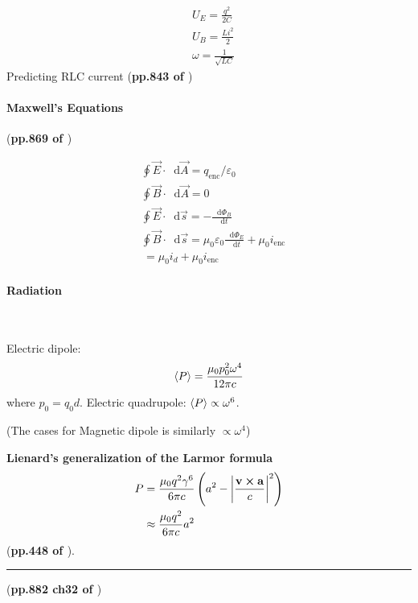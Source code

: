 \documentclass{article}
\newcommand*\diff{\mathop{}\!\mathrm{d}}
\numberwithin{equation}{subsection} %
\theoremstyle{definition}
\begin{document}
\begin{align}
    & U_E = \frac{q^2}{2C} \\
    & U_B = \frac{L i^2}{2} \\
    & \omega = \frac{1}{\sqrt{LC}}
\end{align}
Predicting RLC current (\textbf{pp.843 of \cite{book}})

\paragraph{Maxwell's Equations} (\textbf{pp.869 of \cite{book}})

\begin{align}
    & \oint \vec{E} \cdot \diff \vec{A} = q_\text{enc}/\varepsilon_0
    \\
    & \oint \vec{B} \cdot\diff\vec{A} = 0 \\
    & \oint \vec{E}\cdot\diff\vec{s} = -\frac{\diff\Phi_B}{\diff t} \\
    & \oint \vec{B}\cdot\diff\vec{s} = 
    \mu_0\varepsilon_0 \frac{\diff\Phi_E}{\diff t} +\mu_0 i_\text{enc}
    \nonumber\\
    & \,= \mu_0 i_d + \mu_0 i_\text{enc}
\end{align}

\paragraph{Radiation} $ $

Electric dipole:
\begin{equation}
    \braket{P} = \frac{\mu_0 p_0^2 \omega^4}{12\pi c}
\end{equation}
where $p_0 = q_0 d$.
Electric quadrupole: $\braket{P} \propto \omega^6$.

(The cases for Magnetic dipole is similarly $\propto \omega^4$)

\textbf{Lienard's generalization of the Larmor formula}
\begin{align}
    P &= \frac{\mu_0 q^2 \gamma^6}{6\pi c}
    \left( a^2- \abs{\frac{\vb{v}\cross\vb{a}}{c}}^2\right) \\
    &\approx \frac{\mu_0q^2}{6\pi c} a^2
\end{align}
(\textbf{pp.448 of \cite{Griffiths_electrod}}).

\begin{center}\noindent\rule{8cm}{0.4pt}\end{center}

(\textbf{pp.882 ch32 of \cite{book}})
\end{document}
